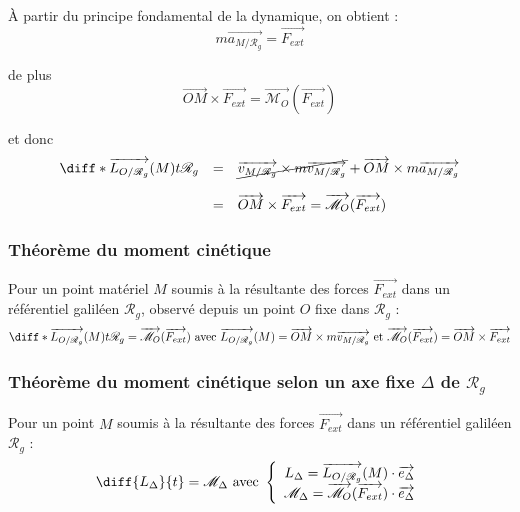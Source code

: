 \documentclass[a4paper,10pt]{book} %
\begin{document}
\`{A} partir du principe fondamental de la dynamique, on obtient : $$m\overrightarrow{a_{M/\mathcal{R}_g}}=\overrightarrow{F_{ext}}$$

de plus $$\overrightarrow{OM}\times \overrightarrow{F_{ext}}=\overrightarrow{\mathcal{M}_O}(\overrightarrow{F_{ext}})$$
\bigskip

et donc 
$$\begin{array}{rcl}
\diff*{\overrightarrow{L_{O/\mathcal{R}_g}}(M)}{t}{\mathcal{R}_g}&=&\cancel{\overrightarrow{v_{M/\mathcal{R}_g}}\times m\overrightarrow{v_{M/\mathcal{R}_g}}}+\overrightarrow{OM}\times m\overrightarrow{a_{M/\mathcal{R}_g}}\\\\
&=&\overrightarrow{OM}\times \overrightarrow{F_{ext}}=\overrightarrow{\mathcal{M}_O}(\overrightarrow{F_{ext}})
\end{array}$$

\newpage

\subsubsection{Théorème du moment cinétique}
Pour un point matériel $M$ soumis à la résultante des forces $\overrightarrow{F_{ext}}$ dans un référentiel galiléen $\mathcal{R}_g$, observé depuis un point $O$ fixe dans $\mathcal{R}_g$ :\\
$$\diff*{\overrightarrow{L_{O/\mathcal{R}_g}}(M)}{t}{\mathcal{R}_g}=\overrightarrow{\mathcal{M}_O}(\overrightarrow{F_{ext}})\text{ avec }
\overrightarrow{L_{O/\mathcal{R}_g}}(M)=\overrightarrow{OM}\times m\overrightarrow{v_{M/\mathcal{R}_g}}\text{ et }
\overrightarrow{\mathcal{M}_O}(\overrightarrow{F_{ext}})=\overrightarrow{OM}\times\overrightarrow{F_{ext}}$$

\bigskip

\subsubsection{Théorème du moment cinétique selon un axe fixe $\Delta$ de $\mathcal{R}_g$}
Pour un point $M$ soumis à la résultante des forces $\overrightarrow{F_{ext}}$ dans un référentiel galiléen $\mathcal{R}_g$ :
$$\diff{L_\Delta}{t}=\mathcal{M}_\Delta\text{ avec }
\left\{\begin{array}{rcl}L_\Delta=\overrightarrow{L_{O/\mathcal{R}_g}}(M)\cdot \overrightarrow{e_\Delta}\\
\mathcal{M}_\Delta=\overrightarrow{\mathcal{M}_O}(\overrightarrow{F_{ext}})\cdot \overrightarrow{e_\Delta}\end{array}\right.$$\\
\end{document}
